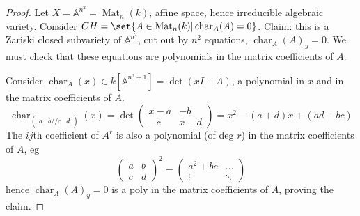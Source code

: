 \documentclass{article}
\newcommand{\A}{\mathbb{A}}
\DeclareMathOperator{\Mat}{Mat}
\DeclareMathOperator{\chara}{char}
\begin{document}
\begin{proof}
    Let $X = \A^{n^2} = \Mat_n(k)$, affine space, hence irreducible algebraic variety.
    Consider $CH = \set{A \in \Mat_n(k) | \chara_A(A) = 0}$.
    Claim: this is a Zariski closed subvariety of $\A^{n^2}$, cut out by $n^2$ equations, $\chara_A(A)_y = 0$.
    We must check that these equations are polynomials in the matrix coefficients of $A$.


    Consider $\chara_A(x) \in k[\A^{n^2 + 1}] = \det(xI - A)$, a polynomial in $x$ and in the matrix coefficients of $A$.
    \begin{equation*}
    \chara_{\begin{pmatrix}a & b//c&d\end{pmatrix}}(x) = \det
        \begin{pmatrix}
            x-a & -b \\ -c & x-d
        \end{pmatrix}
        =x^2  -(a+d) x + (ad - bc)
    \end{equation*}
    The $ij$th coefficient of $A^r$ is also a polynomial (of deg $r$) in the matrix coefficients of $A$, eg
    \begin{equation*}
        \begin{pmatrix}
            a & b \\ c & d
        \end{pmatrix}^2 =
        \begin{pmatrix}
            a^2 + bc & \dots \\
            \vdots & \ddots
        \end{pmatrix}
    \end{equation*}
    hence $\chara_A(A)_y=0$ is a poly in the matrix coefficients of $A$, proving the claim.


\end{proof}
\end{document}
